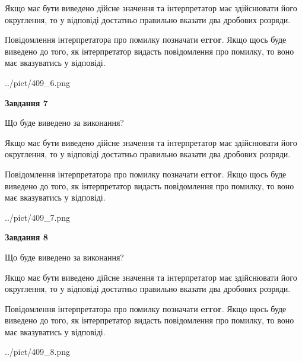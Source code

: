 \documentclass[12pt, ukrainian]{article}
\begin{document}
{\begin {Large}
Якщо має бути виведено дійсне значення та інтерпретатор має здійснювати його округлення, 
то у відповіді достатньо правильно вказати два дробових розряди.

Повідомлення інтерпретатора про помилку позначати \textbf{error}.
Якщо щось буде виведено до того, як інтерпретатор видасть повідомлення про помилку, 
то воно має вказуватись у відповіді. \par

\begin{center}
	{../pict/409_6.png}
\end{center}
\newpage

{\begin {center}\textbf{Завдання 7}\end {center}}\par
Що буде виведено за виконання? \par

Якщо має бути виведено дійсне значення та інтерпретатор має здійснювати його округлення, 
то у відповіді достатньо правильно вказати два дробових розряди.

Повідомлення інтерпретатора про помилку позначати \textbf{error}.
Якщо щось буде виведено до того, як інтерпретатор видасть повідомлення про помилку, 
то воно має вказуватись у відповіді. \par

\begin{center}
	{../pict/409_7.png}
\end{center}
\newpage

{\begin {center}\textbf{Завдання 8}\end {center}}\par
Що буде виведено за виконання? \par

Якщо має бути виведено дійсне значення та інтерпретатор має здійснювати його округлення, 
то у відповіді достатньо правильно вказати два дробових розряди.

Повідомлення інтерпретатора про помилку позначати \textbf{error}.
Якщо щось буде виведено до того, як інтерпретатор видасть повідомлення про помилку, 
то воно має вказуватись у відповіді. \par

\begin{center}
	{../pict/409_8.png}
\end{center}
\newpage


\end{Large}}
\end{document}
